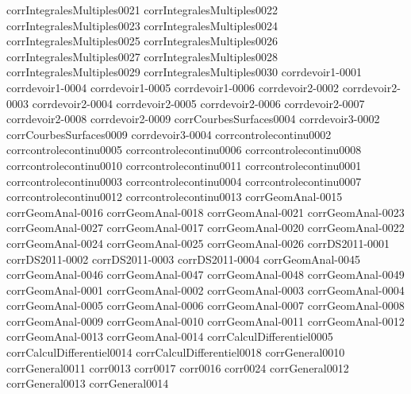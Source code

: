 {corrIntegralesMultiples0021}
{corrIntegralesMultiples0022}
{corrIntegralesMultiples0023}
{corrIntegralesMultiples0024}
{corrIntegralesMultiples0025}
{corrIntegralesMultiples0026}
{corrIntegralesMultiples0027}
{corrIntegralesMultiples0028}
{corrIntegralesMultiples0029}
{corrIntegralesMultiples0030}
{corrdevoir1-0001}
{corrdevoir1-0004}
{corrdevoir1-0005}
{corrdevoir1-0006}
{corrdevoir2-0002}
{corrdevoir2-0003}
{corrdevoir2-0004}
{corrdevoir2-0005}
{corrdevoir2-0006}
{corrdevoir2-0007}
{corrdevoir2-0008}
{corrdevoir2-0009}
{corrCourbesSurfaces0004}
{corrdevoir3-0002}
{corrCourbesSurfaces0009}
{corrdevoir3-0004}
{corrcontrolecontinu0002}
{corrcontrolecontinu0005}
{corrcontrolecontinu0006}
{corrcontrolecontinu0008}
{corrcontrolecontinu0010}
{corrcontrolecontinu0011}
{corrcontrolecontinu0001}
{corrcontrolecontinu0003}
{corrcontrolecontinu0004}
{corrcontrolecontinu0007}
{corrcontrolecontinu0012}
{corrcontrolecontinu0013}
{corrGeomAnal-0015}
{corrGeomAnal-0016}
{corrGeomAnal-0018}
{corrGeomAnal-0021}
{corrGeomAnal-0023}
{corrGeomAnal-0027}
{corrGeomAnal-0017}
{corrGeomAnal-0020}
{corrGeomAnal-0022}
{corrGeomAnal-0024}
{corrGeomAnal-0025}
{corrGeomAnal-0026}
{corrDS2011-0001}
{corrDS2011-0002}
{corrDS2011-0003}
{corrDS2011-0004}
{corrGeomAnal-0045}
{corrGeomAnal-0046}
{corrGeomAnal-0047}
{corrGeomAnal-0048}
{corrGeomAnal-0049}
{corrGeomAnal-0001}
{corrGeomAnal-0002}
{corrGeomAnal-0003}
{corrGeomAnal-0004}
{corrGeomAnal-0005}
{corrGeomAnal-0006}
{corrGeomAnal-0007}
{corrGeomAnal-0008}
{corrGeomAnal-0009}
{corrGeomAnal-0010}
{corrGeomAnal-0011}
{corrGeomAnal-0012}
{corrGeomAnal-0013}
{corrGeomAnal-0014}
{corrCalculDifferentiel0005}
{corrCalculDifferentiel0014}
{corrCalculDifferentiel0018}
{corrGeneral0010}
{corrGeneral0011}
{corr0013}
{corr0017}
{corr0016}
{corr0024}
{corrGeneral0012}
{corrGeneral0013}
{corrGeneral0014}
